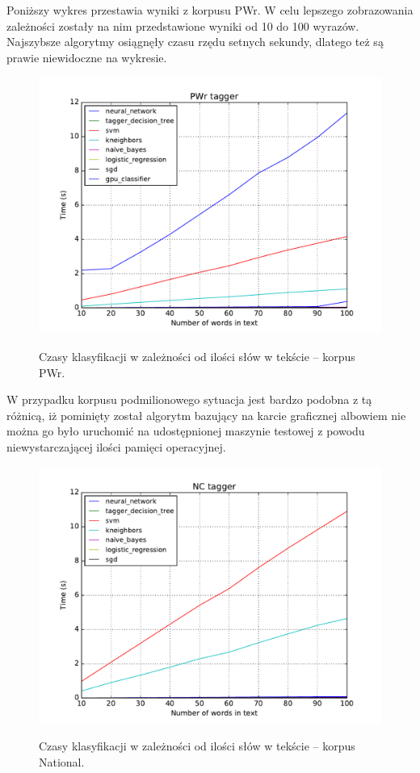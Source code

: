 Poniższy wykres przestawia wyniki z korpusu PWr. W celu lepszego zobrazowania zależności zostały na nim przedstawione wyniki od 10 do 100 wyrazów. Najszybsze algorytmy osiągnęły czasu rzędu setnych sekundy, dlatego też są prawie niewidoczne na wykresie.

\begin{figure}[H]
	\centering
	\includegraphics[width=\linewidth]{charts/czasy_pwr.pdf}
	\label{Rysunek}
	\caption{Czasy klasyfikacji w zależności od ilości słów w tekście -- korpus PWr.}
\end{figure}

\newpage

W przypadku korpusu podmilionowego sytuacja jest bardzo podobna z tą różnicą, iż pominięty został algorytm bazujący na karcie graficznej albowiem nie można go było uruchomić na udostępnionej maszynie testowej z powodu niewystarczającej ilości pamięci operacyjnej.

\begin{figure}[H]
	\centering
	\includegraphics[width=\linewidth]{charts/czasy_nc.pdf}
	\label{Rysunek}
	\caption{Czasy klasyfikacji w zależności od ilości słów w tekście -- korpus National.}
\end{figure}
